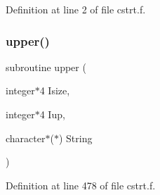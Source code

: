 Definition at line 2 of file cstrt.\+f.

\mbox{\label{cstrt_8f_acbfac21cd5532997f0d5b399227e19f3}} 
\subsubsection{\texorpdfstring{upper()}{upper()}}
{\footnotesize\ttfamily subroutine upper (\begin{DoxyParamCaption}\item[{integer$\ast$4}]{Isize,  }\item[{integer$\ast$4}]{Iup,  }\item[{character$\ast$($\ast$)}]{String }\end{DoxyParamCaption})}



Definition at line 478 of file cstrt.\+f.

